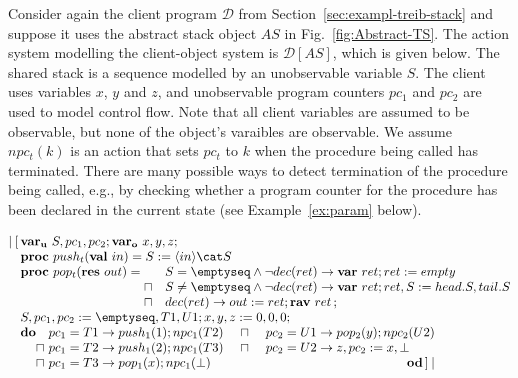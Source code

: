 \documentclass[11pt]{llncs}
\def \proc{{\bf proc}\ }
\def \lact{\mathop{|\joinrel\![}}
\def \ract{\mathop{]\joinrel\!|}}
\def \asgn  {{\;:=\;}}
\def \var {{\bf var}\ }
\def \rav {{\bf rav}\ }
\def \lvar {{\bf var_u}\ }
\def \gvar {{\bf var_o}\ }
\def \val {{\bf val}\ }
\def \res {{\bf res}\ }
\newcommand{\ddo}{\mathbf{do}}
\newcommand{\ood}{\mathbf{od}}
\newcommand{\mcD}{\mathcal{D}}
\newcommand{\reffig}[1]{Fig.~\ref{#1}}
\newcommand{\refsec}[1]{Section~\ref{#1}}
\newcommand{\refex}[1]{Example~\ref{#1}}
\begin{document}
\begin{example} 
  \label{ex:c-as}
  Consider again the client program $\mcD$ from
  \refsec{sec:exampl-treib-stack} and suppose it uses the abstract
  stack object $AS$ in \reffig{fig:Abstract-TS}. The action system
  modelling the client-object system is $\mcD[AS]$, which is given
  below. The shared stack is a sequence modelled by an unobservable
  variable $S$. The client uses variables $x$, $y$ and $z$, and
  unobservable program counters $pc_1$ and $pc_2$ are used to model
  control flow. Note that all client variables are assumed to be
  observable, but none of the object's varaibles are observable. We
  assume $npc_t(k)$ is an action that sets $pc_t$ to $k$ when the
  procedure being called has terminated. There are many possible ways
  to detect termination of the procedure being called, e.g., by
  checking whether a program counter for the procedure has been
  declared in the current state (see \refex{ex:param} below).
  \smallskip
  
  \noindent \hfill
  $ \lact \begin{array}[t]{@{}l@{}} \lvar S, pc_1, pc_2 ; \gvar x, y,
    z ;
            \\
    \begin{array}[t]{@{}l@{}}
      \proc push_t(\val in)  =  S \asgn \langle in
      \rangle \cat S \\
      \proc pop_t(\res out)  =
      \begin{array}[t]{@{}ll@{}}
        & S = \emptyseq \land \neg dec(ret) \to \var ret; ret \asgn empty  \\
        \sqcap & S \neq \emptyseq \land \neg dec(ret) \to \var ret;
                 ret, S \asgn head.S, tail.S\\ 
        \sqcap & dec(ret) \to out \asgn ret ; \rav ret\,;
      \end{array} 
    \end{array} \\
    S, pc_1, pc_2 \asgn \emptyseq, T1, U1 ; x, y, z \asgn 0, 0,
    0 ; 
    \\
    \ddo
    \begin{array}[t]{@{}l@{~}l@{}l@{}}
      & pc_1 = T1 \to  push_1(1) ; npc_1(T2) & \ \ \ \ \sqcap \ \ \ \   pc_2 = U1 \to  pop_2(y) ; npc_2(U2)
      \\
      \sqcap &  pc_1 = T2 \to  push_1(2) ; npc_1(T3)
      & 
      \ \ \ \ \sqcap \ \ \ \   pc_2 = U2 \to  z, pc_2 \asgn x, \bot  
      \\
      \sqcap & pc_1 = T3 \to  pop_1(x)  ; npc_1(\bot) & \hfill \ood \ract
    \end{array}
  \end{array}$\hfill \medskip



\end{example}
\end{document}
